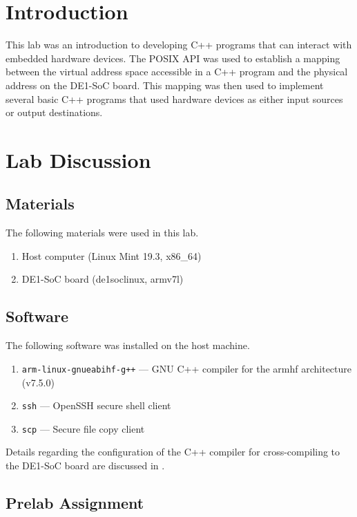 \documentclass[11pt, letterpaper]{article} %
\begin{document}
\makelabtitle

\section*{Introduction}

This lab was an introduction to developing C++ programs that can interact with embedded hardware devices. The POSIX API \cite{wiki:posix} was used to establish a mapping between the virtual address space accessible in a C++ program and the physical address on the DE1-SoC board. This mapping was then used to implement several basic C++ programs that used hardware devices as either input sources or output destinations.


\section*{Lab Discussion}

\subsection*{Materials}

The following materials were used in this lab.
\begin{enumerate}
    \item Host computer (Linux Mint 19.3, x86\_64)
    \item DE1-SoC board (de1soclinux, armv7l)
\end{enumerate}

\subsection*{Software}
The following software was installed on the host machine.
\begin{enumerate}
    \item \texttt{arm-linux-gnueabihf-g++} --- GNU C++ compiler for the armhf architecture (v7.5.0)
    \item \texttt{ssh} --- OpenSSH secure shell client
    \item \texttt{scp} --- Secure file copy client
\end{enumerate}

Details regarding the configuration of the C++ compiler for cross-compiling to the DE1-SoC board are discussed in \cite{report-0}.

\subsection*{Prelab Assignment}
\end{document}
